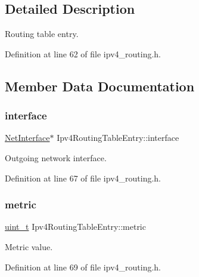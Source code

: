 \subsection{Detailed Description}
Routing table entry. 

Definition at line 62 of file ipv4\+\_\+routing.\+h.



\subsection{Member Data Documentation}
\mbox{\label{structIpv4RoutingTableEntry_a8ce76307907c9a83061e9013d52d5747}} 
\subsubsection{\texorpdfstring{interface}{interface}}
{\footnotesize\ttfamily \hyperlink{net_8h_a2234db8911a1148c9159979d8f5e0d6b}{Net\+Interface}$\ast$ Ipv4\+Routing\+Table\+Entry\+::interface}



Outgoing network interface. 



Definition at line 67 of file ipv4\+\_\+routing.\+h.

\mbox{\label{structIpv4RoutingTableEntry_a26bead504f303ef1a599b0baa26ecd8d}} 
\subsubsection{\texorpdfstring{metric}{metric}}
{\footnotesize\ttfamily \hyperlink{compiler__port_8h_a12a1e9b3ce141648783a82445d02b58d}{uint\+\_\+t} Ipv4\+Routing\+Table\+Entry\+::metric}



Metric value. 



Definition at line 69 of file ipv4\+\_\+routing.\+h.

\mbox{\label{structIpv4RoutingTableEntry_a1c041064a846ea939cf5af2dce900c26}} 
